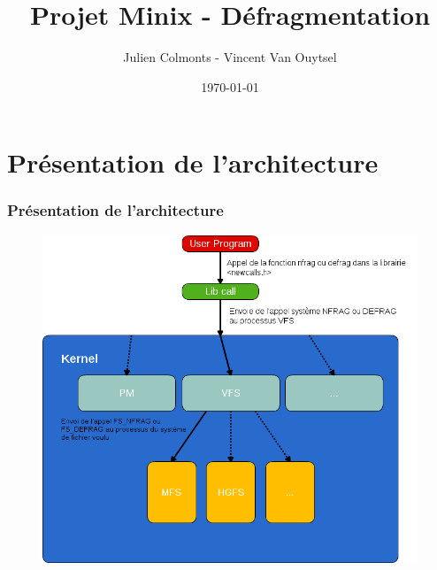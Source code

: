 \documentclass[handout]{beamer}
\title[Projet Minix]{Projet Minix - Défragmentation} %
\author[Colmonts - Van Ouytsel] {Julien Colmonts - Vincent Van Ouytsel} %
\institute[UCL] %
{
Université Catholique de Louvain \\ %
\medskip

}
\date{\today} %
\begin{document}
\begin{frame}
\titlepage %
\end{frame}


\section{Présentation de l'architecture} %

\begin{frame}
\frametitle{Présentation de l'architecture}
\begin{figure}
\includegraphics[scale=0.3]{schemas/archigen.png}
\end{figure}
\end{frame}

\end{document}
